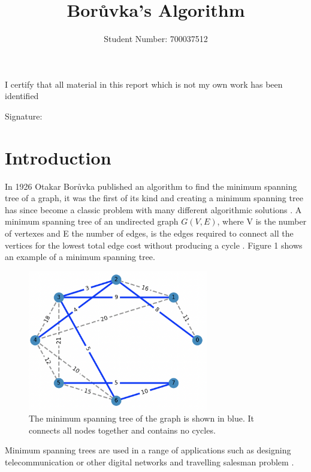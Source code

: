 \documentclass[a4paper,11pt]{article}
\title{Borůvka's Algorithm}
\author{Student Number: 700037512}
\date{}
\begin{document}
\maketitle
\thispagestyle{empty}
\begin{abstract}
\noindent

\end{abstract}

\vspace*{\fill}
\begin{center}
\noindent I certify that all material in this report which is not my own work has been
identified
\end{center}
\vspace{1em}

Signature: \hrulefill
\clearpage
{} 

\newpage
\section{Introduction}
In 1926 Otakar Borůvka published an algorithm to find the minimum spanning tree of a graph, it was the first of its kind and creating a minimum spanning tree has since become a classic problem with many different algorithmic solutions \cite{4392963}\cite{nevsetril2012origins}. A minimum spanning tree of an undirected graph $G(V,E)$, where V is the number of vertexes and E the number of edges, is the edges required to connect all the vertices for the lowest total edge cost without producing a cycle \cite{mst}. Figure 1 shows an example of a minimum spanning tree. 
\begin{figure}[!h]
    \centering
    \includegraphics[width = 0.7\textwidth]{Screenshot 2022-12-07 at 5.26.26 pm.png}
    \caption{The minimum spanning tree of the graph is shown in blue. It connects all nodes together and contains no cycles.}
    \label{fig:my_label}
\end{figure}
\FloatBarrier
Minimum spanning trees are used in a range of applications such as designing telecommunication or other digital networks and travelling salesman problem \cite{nagarajan2014application}.
\end{document}

